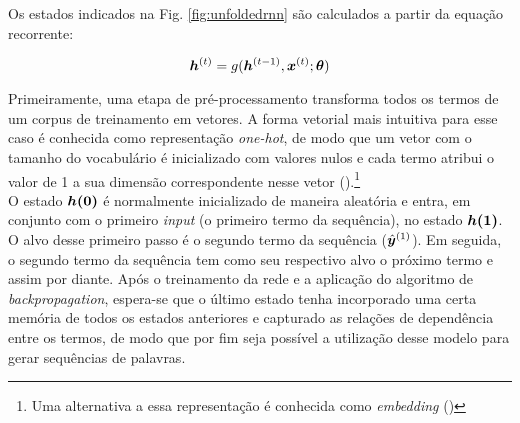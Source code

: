 %


Os estados indicados na Fig. \ref{fig:unfoldedrnn} são calculados a partir da equação recorrente:

\begin{equation}
\bm{h}^{(t)} = g(\bm{h}^{(t-1)}, \bm{x}^{(t)}; \bm{\theta})
\label{eq:rnn}
\end{equation}

Primeiramente, uma etapa de pré-processamento transforma todos os termos de um corpus de treinamento em vetores. A forma vetorial mais intuitiva para esse caso é conhecida como representação \textit{one-hot}, de modo que um vetor com o tamanho do vocabulário é inicializado com valores nulos e cada termo atribui o valor de 1 a sua dimensão correspondente nesse vetor (\cite{harris:2013}).\footnote{Uma alternativa a essa representação é conhecida como \textit{embedding} (\cite{word2vec:2013})}\\
O estado $\bm{h(0)}$ é normalmente inicializado de maneira aleatória e entra, em conjunto com o primeiro \textit{input} (o primeiro termo da sequência), no estado $\bm{h(1)}$. O alvo desse primeiro passo é o segundo termo da sequência ($\hat{\bm{y}}^{(1)}$). Em seguida, o segundo termo da sequência tem como seu respectivo alvo o próximo termo e assim por diante. Após o treinamento da rede e a aplicação do algoritmo de \textit{backpropagation}, espera-se que o último estado tenha incorporado uma certa memória de todos os estados anteriores e capturado as relações de dependência entre os termos, de modo que por fim seja possível a utilização desse modelo para gerar sequências de palavras. 